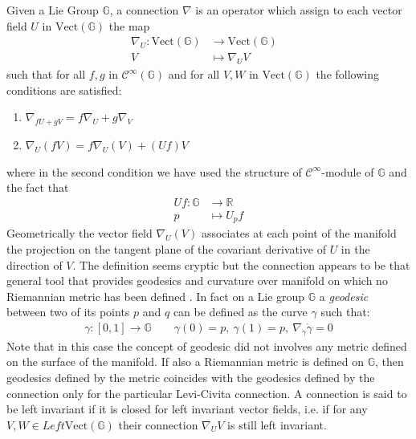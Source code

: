 Given a Lie Group $\mathbb{G}$, a connection $\nabla$ is an operator which assign to each vector field $U$ in $\text{Vect}(\mathbb{G})$ the map
\begin{align*}
\nabla_{U} : \text{Vect}(\mathbb{G}) & \longrightarrow  \text{Vect}(\mathbb{G}) &   \\
V &\longmapsto  \nabla_{U}V
\end{align*}
such that for all $f,g$ in $\mathcal{C}^{\infty}(\mathbb{G})$ and for all $V,W$ in $\text{Vect}(\mathbb{G})$ the following conditions are satisfied:
\begin{enumerate}
	\item $ \nabla_{fU + gV} = f\nabla_{U} + g\nabla_{V}$
	\item $\nabla_{U}(fV) = f \nabla_{U}(V) + (Uf)V $
\end{enumerate}
where in the second condition we have used the structure of  $\mathcal{C}^{\infty}$-module of $\mathbb{G}$ and the fact that 
\begin{align*}
Uf: \mathbb{G} & \longrightarrow  \mathbb{R}    \\
p &\longmapsto  U_{p}f
\end{align*}
Geometrically the vector field $\nabla_{U}(V)$ associates at each point of the manifold the projection on the tangent plane of the covariant derivative of $U$ in the direction of $V$. The definition seems cryptic but the connection appears to be that general tool that provides geodesics and curvature over manifold on which no Riemannian metric has been defined \cite{do1992riemannian}.
In fact on a Lie group $\mathbb{G}$ a \emph{geodesic} between two of its points $p$ and $q$ can be defined as the curve $\gamma$ such that:
\begin{align*}
\gamma:[0,1] \longrightarrow \mathbb{G} \qquad \gamma(0)=p,~ \gamma(1) = p,~ \nabla_{\dot{\gamma}}\dot{\gamma} = 0 
\end{align*} 
Note that in this case the concept of geodesic did not involves any metric defined on the surface of the manifold. If also a Riemannian metric is defined on $\mathbb{G} $, then geodesics defined by the metric coincides with the geodesics defined by the connection only for the particular Levi-Civita connection.
A connection is said to be left invariant if it is closed for left invariant vector fields, i.e. if for any $V, W \in Left\text{Vect}(\mathbb{G}) $ their connection $ \nabla_{U}V$ is still left invariant.

